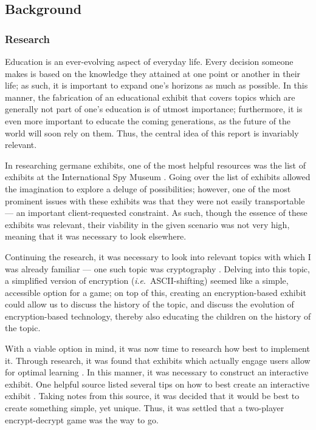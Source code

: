 \documentclass[conference]{IEEEtran}
\begin{document}
\subsection{Background}

\subsubsection{Research}

\par Education is an ever-evolving aspect of everyday life. Every decision someone makes is based on the knowledge they attained at one point or another in their life; as such, it is important to expand one's horizons as much as possible. In this manner, the fabrication of an educational exhibit that covers topics which are generally not part of one's education is of utmost importance; furthermore, it is even more important to educate the coming generations, as the future of the world will soon rely on them. Thus, the central idea of this report is invariably relevant.
\par In researching germane exhibits, one of the most helpful resources was the list of exhibits at the International Spy Museum \cite{b7}. Going over the list of exhibits allowed the imagination to explore a deluge of possibilities; however, one of the most prominent issues with these exhibits was that they were not easily transportable — an important client-requested constraint. As such, though the essence of these exhibits was relevant, their viability in the given scenario was not very high, meaning that it was necessary to look elsewhere.
\par Continuing the research, it was necessary to look into relevant topics with which I was already familiar — one such topic was cryptography \cite{b4}. Delving into this topic, a simplified version of encryption (\textit{i}.\textit{e}.\ ASCII-shifting) seemed like a simple, accessible option for a game; on top of this, creating an encryption-based exhibit could allow us to discuss the history of the topic, and discuss the evolution of encryption-based technology, thereby also educating the children on the history of the topic.
\par With a viable option in mind, it was now time to research how best to implement it. Through research, it was found that exhibits which actually engage users allow for optimal learning \cite{b10}. In this manner, it was necessary to construct an interactive exhibit. One helpful source listed several tips on how to best create an interactive exhibit \cite{b11}. Taking notes from this source, it was decided that it would be best to create something simple, yet unique. Thus, it was settled that a two-player encrypt-decrypt game was the way to go.
\end{document}
